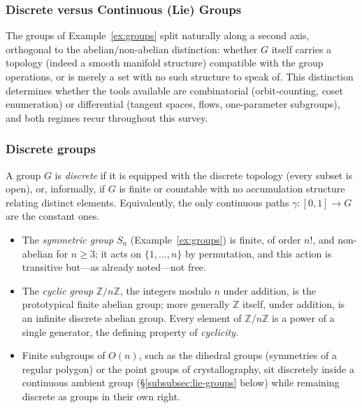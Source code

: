 \documentclass[mathematics,review,submit,moreauthors]{Definitions/mdpi}
\begin{document}

\subsubsection{Discrete versus Continuous (Lie) Groups}
\label{subsec:discrete-vs-lie}

The groups of Example~\ref{ex:groups} split naturally along a second axis,
orthogonal to the abelian/non-abelian distinction: whether $G$ itself carries
a topology (indeed a smooth manifold structure) compatible with the group
operations, or is merely a set with no such structure to speak of. This
distinction determines whether the tools available are combinatorial
(orbit-counting, coset enumeration) or differential (tangent spaces, flows,
one-parameter subgroups), and both regimes recur throughout this survey.

\subsubsection{Discrete groups}
\label{subsubsec:discrete-groups}

\begin{Definition}
\label{def:discrete-group}
A group $G$ is \emph{discrete} if it is equipped with the discrete topology
(every subset is open), or, informally, if $G$ is finite or countable with
no accumulation structure relating distinct elements. Equivalently, the only
continuous paths $\gamma : [0,1] \to G$ are the constant ones.
\end{Definition}

\begin{Example}
\label{ex:discrete-groups}
\begin{itemize}
    \item The \emph{symmetric group} $S_n$ (Example~\ref{ex:groups}) is
    finite, of order $n!$, and non-abelian for $n \geq 3$; it acts on
    $\{1,\dots,n\}$ by permutation, and this action is transitive but---as
    already noted---not free.
    \item The \emph{cyclic group} $\mathbb{Z}/n\mathbb{Z}$, the integers
    modulo $n$ under addition, is the prototypical finite abelian group; more
    generally $\mathbb{Z}$ itself, under addition, is an infinite discrete
    abelian group. Every element of $\mathbb{Z}/n\mathbb{Z}$ is a power of a
    single generator, the defining property of \emph{cyclicity}.
    \item Finite subgroups of $O(n)$, such as the dihedral groups
    (symmetries of a regular polygon) or the point groups of crystallography,
    sit discretely inside a continuous ambient group
    (\S\ref{subsubsec:lie-groups} below) while remaining discrete as groups
    in their own right.
\end{itemize}
\end{Example}
\end{document}

